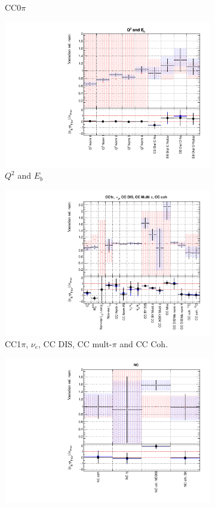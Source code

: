 \begin{figure}
\begin{subfigure}{0.49\textwidth}
  \caption{CC0$\pi$}
\end{subfigure}
\begin{subfigure}{0.49\textwidth}
  \centering
  \includegraphics[width=0.9\linewidth]{figs/fixed2p2hfitsxsec2}
  \caption{$Q^2$ and $E_b$}
\end{subfigure}
\begin{subfigure}{0.49\textwidth}
  \centering
  \includegraphics[width=0.9\linewidth]{figs/fixed2p2hfitsxsec3}
  \caption{CC1$\pi$, $\nu_e$, CC DIS, CC mult-$\pi$ and CC Coh.}
\end{subfigure}
\begin{subfigure}{0.49\textwidth}
  \centering
  \includegraphics[width=0.9\linewidth]{figs/fixed2p2hfitsxsec4}

\end{subfigure}
\end{figure}
